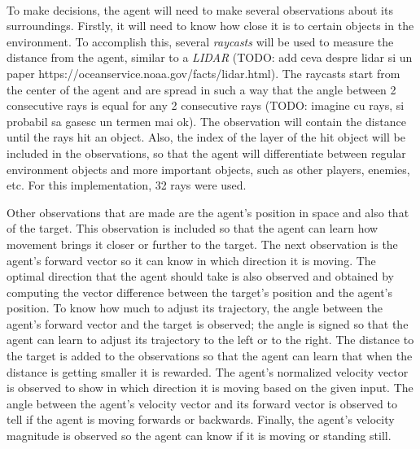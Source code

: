 \paragraph{}
To make decisions, the agent will need to make several observations about its surroundings. Firstly, it will need to know how close it is to certain objects in the environment. To accomplish this, several \emph{raycasts} will be used to measure the distance from the agent, similar to a \emph{LIDAR} (TODO: add ceva despre lidar si un paper https://oceanservice.noaa.gov/facts/lidar.html). The raycasts start from the center of the agent and are spread in such a way that the angle between 2 consecutive rays is equal for any 2 consecutive rays (TODO: imagine cu rays, si probabil sa gasesc un termen mai ok). The observation will contain the distance until the rays hit an object. Also, the index of the layer of the hit object will be included in the observations, so that the agent will differentiate between regular environment objects and more important objects, such as other players, enemies, etc. For this implementation, 32 rays were used.

Other observations that are made are the agent's position in space and also that of the target. This observation is included so that the agent can learn how movement brings it closer or further to the target. The next observation is the agent's forward vector so it can know in which direction it is moving. The optimal direction that the agent should take is also observed and obtained by computing the vector difference between the target's position and the agent's position. To know how much to adjust its trajectory, the angle between the agent's forward vector and the target is observed; the angle is signed so that the agent can learn to adjust its trajectory to the left or to the right. The distance to the target is added to the observations so that the agent can learn that when the distance is getting smaller it is rewarded. The agent's normalized velocity vector is observed to show in which direction it is moving based on the given input. The angle between the agent's velocity vector and its forward vector is observed to tell if the agent is moving forwards or backwards. Finally, the agent's velocity magnitude is observed so the agent can know if it is moving or standing still. 

